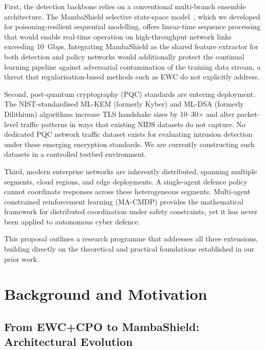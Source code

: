 \documentclass[12pt,a4paper]{article}
\theoremstyle{definition}
\begin{document}
First, the detection backbone relies on a conventional multi-branch ensemble architecture. The MambaShield selective state-space model~\cite{anaedevha2026mambashield}, which we developed for poisoning-resilient sequential modelling, offers linear-time sequence processing that would enable real-time operation on high-throughput network links exceeding 10~Gbps. Integrating MambaShield as the shared feature extractor for both detection and policy networks would additionally protect the continual learning pipeline against adversarial contamination of the training data stream, a threat that regularisation-based methods such as EWC do not explicitly address.

Second, post-quantum cryptography (PQC) standards are entering deployment. The NIST-standardised ML-KEM (formerly Kyber) and ML-DSA (formerly Dilithium) algorithms increase TLS handshake sizes by 10--30$\times$ and alter packet-level traffic patterns in ways that existing NIDS datasets do not capture. No dedicated PQC network traffic dataset exists for evaluating intrusion detection under these emerging encryption standards. We are currently constructing such datasets in a controlled testbed environment.

Third, modern enterprise networks are inherently distributed, spanning multiple segments, cloud regions, and edge deployments. A single-agent defence policy cannot coordinate responses across these heterogeneous segments. Multi-agent constrained reinforcement learning (MA-CMDP) provides the mathematical framework for distributed coordination under safety constraints, yet it has never been applied to autonomous cyber defence.

This proposal outlines a research programme that addresses all three extensions, building directly on the theoretical and practical foundations established in our prior work.

\section{Background and Motivation}
\label{sec:background}

\subsection{From EWC+CPO to MambaShield: Architectural Evolution}
\end{document}
